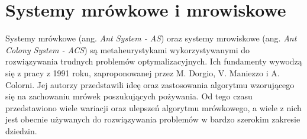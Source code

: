 \chapter{Systemy mrówkowe i mrowiskowe}\label{chap:antsys}
{

    Systemy mrówkowe (ang. \textit{Ant System - AS}) oraz systemy mrowiskowe (ang. \textit{Ant Colony System - ACS}) są
    metaheurystykami wykorzystywanymi do rozwiązywania trudnych problemów optymalizacyjnych. Ich fundamenty wywodzą się
    z pracy z 1991 roku, zaproponowanej przez M. Dorgio, V. Maniezzo i A. Colorni\cite{Dorigo1991AntSA}. Jej autorzy
    przedstawili ideę oraz zastosowania algorytmu wzorującego się na zachowaniu mrówek poszukujących pożywania. Od tego
    czasu przedstawiono wiele wariacji oraz ulepszeń algorytmu mrówkowego, a wiele z nich jest obecnie używanych do
    rozwiązywania problemów w bardzo szerokim zakresie dziedzin.

}
